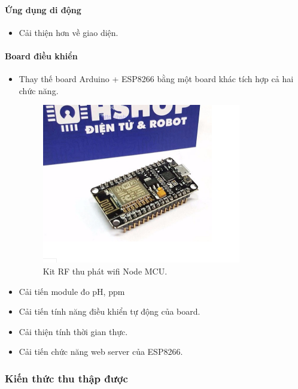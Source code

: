 \documentclass[a4paper,12pt,oneside]{article}
\begin{document}
\paragraph{Ứng dụng di động}
\begin{itemize}
\item Cải thiện hơn về giao diện.
\end{itemize}

\paragraph{Board điều khiển}
\begin{itemize}
\item Thay thế board Arduino + ESP8266 bằng một board khác tích hợp cả hai chức năng.
\begin{figure}[H]
\begin{center}
\includegraphics[scale=.8]{hinh/nodeMCU.png}
\end{center}
\caption{Kit RF thu phát wifi Node MCU.}
\end{figure}
\item Cải tiến module đo pH, ppm
\item Cải tiến tính năng điều khiển tự động của board.
\item Cải thiện tính thời gian thực.
\item Cải tiến chức năng web server của ESP8266.
\end{itemize}
\newpage


\subsubsection{Kiến thức thu thập được}
\end{document}
